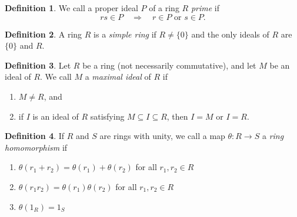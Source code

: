 \documentclass[12pt]{article}
\newcommand{\enumarabic}[1]{
	\begin{enumerate}[label=\textbf{\arabic*.}]
		#1
	\end{enumerate}
}
\theoremstyle{definition}
\newtheorem*{defn}{Definition}
\begin{document}
\begin{defn}
	We call a proper ideal $P$ of a ring $R$ \emph{prime} if 
	\[rs\in P\quad\Rightarrow\quad r\in P\text{ or }s\in P.\]
\end{defn}
\begin{defn}
	A ring $R$ is a \emph{simple ring} if $R\neq\{0\}$ and the only ideals of $R$ are $\{0\}$ and $R$.
\end{defn}
\begin{defn}
	Let $R$ be a ring (not necessarily commutative), and let $M$ be an ideal of $R$.  We call $M$ a \emph{maximal ideal} of $R$ if
	\enumarabic{
		\item $M\neq R$, and
		\item if $I$ is an ideal of $R$ satisfying $M\subseteq I\subseteq R$, then $I=M$ or $I=R$.
	}
\end{defn}
\begin{defn}
	If $R$ and $S$ are rings with unity, we call a map $\theta:R\to S$ a \emph{ring homomorphism} if
	\enumarabic{
		\item $\theta(r_1+r_2)=\theta(r_1)+\theta(r_2)$ for all $r_1,r_2\in R$
		\item $\theta(r_1r_2)=\theta(r_1)\theta(r_2)$ for all $r_1,r_2\in R$
		\item $\theta(1_R)=1_S$
	}
\end{defn}
\end{document}
